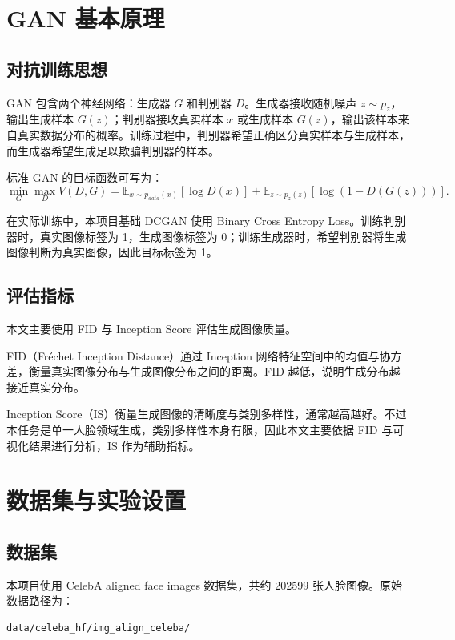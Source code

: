 \documentclass[UTF8,a4paper,12pt]{ctexart}
\begin{document}
\section{GAN 基本原理}

\subsection{对抗训练思想}

GAN 包含两个神经网络：生成器 $G$ 和判别器 $D$。生成器接收随机噪声 $z \sim p_z$，输出生成样本 $G(z)$；判别器接收真实样本 $x$ 或生成样本 $G(z)$，输出该样本来自真实数据分布的概率。训练过程中，判别器希望正确区分真实样本与生成样本，而生成器希望生成足以欺骗判别器的样本。

标准 GAN 的目标函数可写为：
\begin{equation}
\min_G \max_D V(D,G) =
\mathbb{E}_{x \sim p_{data}(x)}[\log D(x)] +
\mathbb{E}_{z \sim p_z(z)}[\log(1-D(G(z)))] .
\end{equation}

在实际训练中，本项目基础 DCGAN 使用 Binary Cross Entropy Loss。训练判别器时，真实图像标签为 1，生成图像标签为 0；训练生成器时，希望判别器将生成图像判断为真实图像，因此目标标签为 1。

\subsection{评估指标}

本文主要使用 FID 与 Inception Score 评估生成图像质量。

FID（Fr\'{e}chet Inception Distance）通过 Inception 网络特征空间中的均值与协方差，衡量真实图像分布与生成图像分布之间的距离。FID 越低，说明生成分布越接近真实分布。

Inception Score（IS）衡量生成图像的清晰度与类别多样性，通常越高越好。不过本任务是单一人脸领域生成，类别多样性本身有限，因此本文主要依据 FID 与可视化结果进行分析，IS 作为辅助指标。

\section{数据集与实验设置}

\subsection{数据集}

本项目使用 CelebA aligned face images 数据集，共约 202599 张人脸图像。原始数据路径为：
\begin{verbatim}
data/celeba_hf/img_align_celeba/
\end{verbatim}
\end{document}
